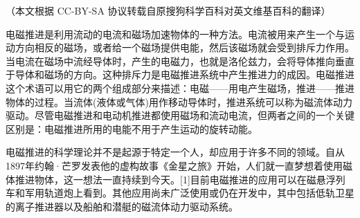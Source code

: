 
（本文根据 CC-BY-SA 协议转载自原搜狗科学百科对英文维基百科的翻译）

电磁推进是利用流动的电流和磁场加速物体的一种方法。电流被用来产生一个与运动方向相反的磁场，或者给一个磁场提供电能，然后该磁场就会受到排斥力作用。当电流在磁场中流经导体时，产生的电磁力，也就是洛伦兹力，会将导体推向垂直于导体和磁场的方向。这种排斥力是电磁推进系统中产生推进力的成因。电磁推进这个术语可以用它的两个组成部分来描述：电磁——用电产生磁场，推进——推进物体的过程。当流体(液体或气体)用作移动导体时，推进系统可以称为磁流体动力驱动。尽管电磁推进和电动机推进都使用磁场和流动电流，但两者之间的一个关键区别是：电磁推进所用的电能不用于产生运动的旋转动能。

电磁推进的科学理论并不是起源于特定一个人，却应用于许多不同的领域。自从1897年约翰·芒罗发表他的虚构故事《金星之旅》开始，人们就一直梦想着使用磁体推进物体，这一想法一直持续到今天。[1]目前电磁推进的应用可以在磁悬浮列车和军用轨道炮上看到。其他应用尚未广泛使用或仍在开发中，其中包括低轨卫星的离子推进器以及船舶和潜艇的磁流体动力驱动系统。